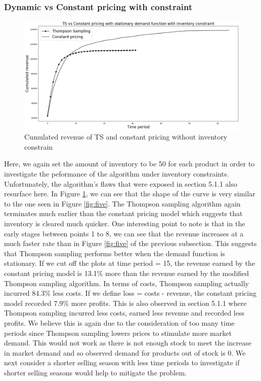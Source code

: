 \documentclass[a4paper]{article}
\begin{document}
\subsubsection{Dynamic vs Constant pricing with constraint}
\begin{figure}[h]
	\centering
	\includegraphics[width=1.03\textwidth]{3.png}
	\caption{\label{fig:3}Cumulated revenue of TS and constant pricing without inventory constrain}
\end{figure}
Here, we again set the amount of inventory to be 50 for each product in order to investigate the peformance of the algorithm under inventory constraints. Unfortunately, the algorithm's flaws that were exposed in section 5.1.1 also resurface here. In Figure \ref{fig:3}, we can see that the shape of the curve is very similar to the one seen in Figure \ref{fig:five}. The Thompson sampling algorithm again terminates much earlier than the constant pricing model which suggests that inventory is cleared much quicker. One interesting point to note is that in the early stages between points 1 to 8, we can see that the revenue increases at a much faster rate than in Figure \ref{fig:five} of the previous subsection. This suggests that Thompson sampling performs better when the demand function is stationary.
\newline
\newline
If we cut off the plots at time period = 15, the revenue earned by the constant pricing model is 13.1\% more than the revenue earned by the modified Thompson sampling algorithm. In terms of costs, Thompson sampling actually incurred 84.3\% less costs. If we define loss = costs - revenue, the constant pricing model recorded 7.9\% more profits. This is also observed in section 5.1.1 where Thompson sampling incurred less costs, earned less revenue and recorded less profits. We believe this is again due to the consideration of too many time periods since Thompson sampling lowers prices to stimulate more market demand. This would not work as there is not enough stock to meet the increase in market demand and so observed demand for products out of stock is 0. We next consider a shorter selling season with less time periods to investigate if shorter selling seasons would help to mitigate the problem.
\newpage
\end{document}
